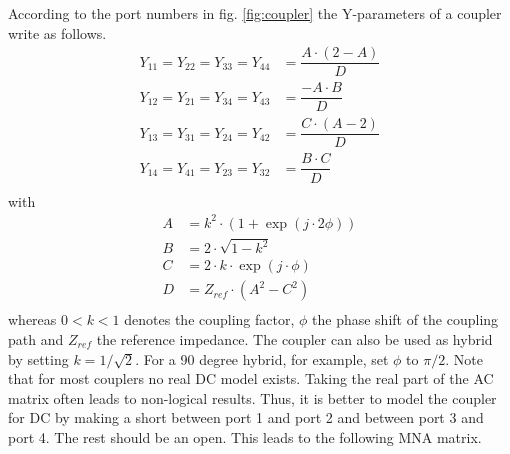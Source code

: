 According to the port numbers in fig. \ref{fig:coupler}
the Y-parameters of a coupler write as follows.
\begin{align}
Y_{11} = Y_{22} = Y_{33} = Y_{44} &= \dfrac{A\cdot \left(2-A\right)}{D} \\
Y_{12} = Y_{21} = Y_{34} = Y_{43} &= \dfrac{-A\cdot B}{D} \\
Y_{13} = Y_{31} = Y_{24} = Y_{42} &= \dfrac{C\cdot \left(A-2\right)}{D} \\
Y_{14} = Y_{41} = Y_{23} = Y_{32} &= \dfrac{B\cdot C}{D} \\
\end{align}
with
\begin{align}
A &= k^2 \cdot \left( 1+\exp\left(j\cdot 2\phi\right) \right) \\
B &= 2 \cdot \sqrt{1-k^2} \\
C &= 2 \cdot k \cdot \exp\left(j\cdot\phi\right) \\
D &= Z_{ref}\cdot \left(A^2 - C^2\right) \\
\end{align}
whereas $0<k<1$ denotes the coupling factor, $\phi$ the phase shift of
the coupling path and $Z_{ref}$ the reference impedance.  The coupler
can also be used as hybrid by setting $k=1/\sqrt{2}$.  For a 90 degree
hybrid, for example, set $\phi$ to $\pi / 2$.  Note that for most
couplers no real DC model exists.  Taking the real part of the AC
matrix often leads to non-logical results.  Thus, it is better to
model the coupler for DC by making a short between port 1 and port 2
and between port 3 and port 4.  The rest should be an open.  This
leads to the following MNA matrix.
